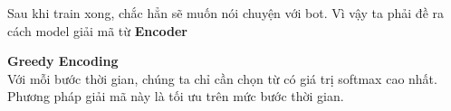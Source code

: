 Sau khi train xong, chắc hẳn sẽ muốn nói chuyện với bot. Vì vậy ta phải đề ra cách model giải mã từ \textbf{Encoder}

\textbf{Greedy Encoding} \\
Với mỗi bước thời gian, chúng ta chỉ cần chọn từ có giá trị softmax cao nhất. Phương pháp giải mã
này là tối ưu trên mức bước thời gian.